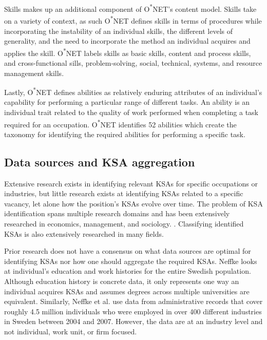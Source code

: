 \documentclass[12pt]{article}
\begin{document}
Skills makes up an additional component of O\textsuperscript{*}NET's content model. Skills take on a variety of context, as such O\textsuperscript{*}NET defines skills in terms of procedures while incorporating the instability of an individual skills, the different levels of generality, and the need to incorporate the method an individual acquires and applies the skill.\cite{skills} O\textsuperscript{*}NET labels skills as basic skills, content and process skills, and cross-functional sills, problem-solving, social, technical, systems, and resource management skills.\cite{skills}

Lastly, O\textsuperscript{*}NET defines abilities as relatively enduring attributes of an individual's capability for performing a particular range of different tasks.\cite{abilities} An ability is an individual trait related to the quality of work performed when completing a task required for an occupation. O\textsuperscript{*}NET identifies 52 abilities which create the taxonomy for identifying the required abilities for performing a specific task.\cite{abilities}  

\subsection{Data sources and KSA aggregation}

Extensive research exists in identifying relevant KSAs for specific occupations or industries, but little research exists at identifying KSAs related to a specific vacancy, let alone how the position's KSAs evolve over time. The problem of KSA identification spans multiple research domains and has been extensively researched in economics, management, and sociology. \cite{investment_human_capital, task_specific, on_the_mechanics, diversification}. Classifying identified KSAs is also extensively researched in many fields.\cite{specialization_career,industry-specific_human_capital, human_capital_specificity} 

Prior research does not have a consensus on what data sources are optimal for identifying KSAs nor how one should aggregate the required KSAs. Neffke looks at individual's education and work histories for the entire Swedish population.\cite{value_of_complementarity} Although education history is concrete data, it only represents one way an individual acquires KSAs and assumes degrees across multiple universities are equivalent. Similarly, Neffke et al. use data from administrative records that cover roughly 4.5 million individuals who were employed in over 400 different industries in Sweden between 2004 and 2007.\cite{skill_relatedness} However, the data are at an industry level and not individual, work unit, or firm focused. 
\end{document}
